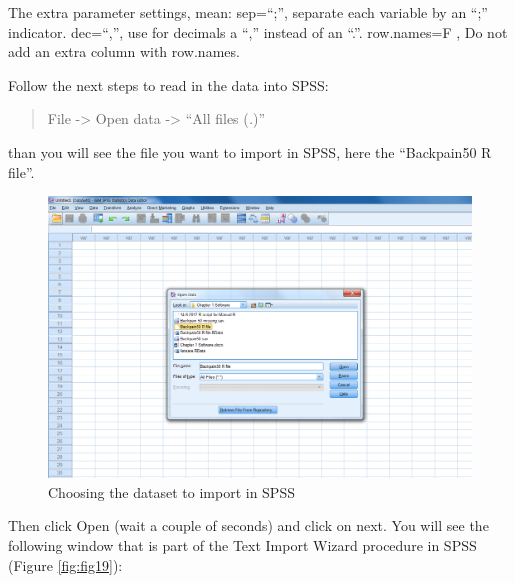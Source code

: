 \documentclass[]{book}
\begin{document}
The extra parameter settings, mean: sep=``;'', separate each variable by
an ``;'' indicator. dec=``,'', use for decimals a ``,'' instead of an
``.''. row.names=F , Do not add an extra column with row.names.

Follow the next steps to read in the data into SPSS:

\begin{quote}
File -\textgreater{} Open data -\textgreater{} ``All files (\emph{.})''
\end{quote}

than you will see the file you want to import in SPSS, here the
``Backpain50 R file''.

\begin{figure}

{\centering \includegraphics[width=0.95\linewidth]{images/fig1.18} 

}

\caption{Choosing the dataset to import in SPSS}\label{fig:fig18}
\end{figure}

Then click Open (wait a couple of seconds) and click on next. You will
see the following window that is part of the Text Import Wizard
procedure in SPSS (Figure \ref{fig:fig19}):
\end{document}
